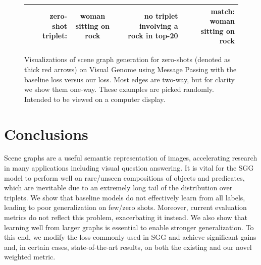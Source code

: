 \begin{figure}
\begin{tabular}{p{0.3cm}|rc|p{0.1cm}rc|p{0.1cm}rc}
		& zero-shot triplet: & {woman sitting on rock} & & \multicolumn{2}{r|}{no triplet involving a rock in top-20} & & \multicolumn{2}{r}{match: woman sitting on rock}\\
		\hline
	\end{tabular}
	\vspace{-5pt}
	\caption{\small Visualizations of scene graph generation for zero-shots (denoted as thick red arrows) on Visual Genome using Message Passing with the baseline loss versus our loss. Most edges are two-way, but for clarity we show them one-way.
		{These examples are picked randomly. Intended to be viewed on a computer display.}}
	\label{fig:example}
\end{figure}

\section{Conclusions}
\vspace{-8pt}

Scene graphs are a useful semantic representation of images, accelerating research in many applications including visual question answering.
It is vital for the SGG model to perform well on rare/unseen compositions of objects and predicates, which are inevitable due to an extremely long tail of the distribution over triplets. We show that baseline models do not effectively learn from all labels, leading to poor generalization on few/zero shots. Moreover, current evaluation metrics do not reflect this problem, exacerbating it instead.
We also show that learning well from larger graphs is essential to enable stronger generalization. To this end, we modify the loss commonly used in SGG and achieve significant gains and, in certain cases, state-of-the-art results, on both the existing and our novel weighted metric.

